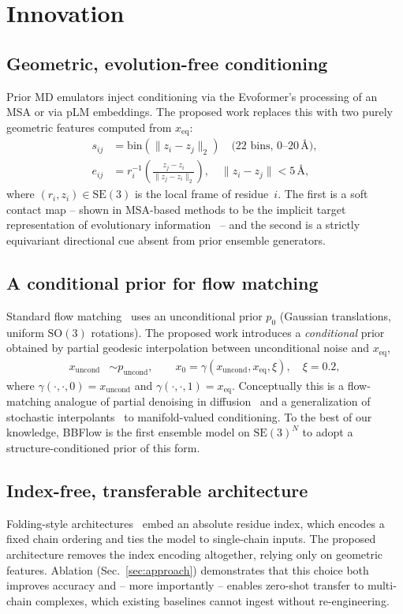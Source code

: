\documentclass[12pt]{article}
\begin{document}
\section{Innovation}

\subsection{Geometric, evolution-free conditioning}
Prior MD emulators inject conditioning via the Evoformer's processing of an MSA
or via pLM embeddings. The proposed work replaces this with two purely
geometric features computed from $x_{\mathrm{eq}}$:
\begin{align}
  s_{ij} &= \mathrm{bin}\!\left(\|z_i - z_j\|_2\right) \quad\text{(22 bins, $0$--$20\,\text{\AA}$)},\\
  e_{ij} &= r_i^{-1}\!\left(\frac{z_j-z_i}{\|z_j-z_i\|_2}\right), \quad \|z_i-z_j\| < 5\,\text{\AA},
\end{align}
where $(r_i, z_i) \in \mathrm{SE}(3)$ is the local frame of residue~$i$. The
first is a soft contact map -- shown in MSA-based methods to be the implicit
target representation of evolutionary information~\cite{lin2023esm2} -- and the
second is a strictly equivariant directional cue absent from prior ensemble
generators.

\subsection{A conditional prior for flow matching}
Standard flow matching~\cite{lipman2023flowmatching} uses an unconditional prior
$p_0$ (Gaussian translations, uniform $\mathrm{SO}(3)$ rotations). The proposed
work introduces a \emph{conditional} prior obtained by partial geodesic
interpolation between unconditional noise and $x_{\mathrm{eq}}$,
\begin{align}
  x_{\mathrm{uncond}} &\sim p_{\mathrm{uncond}}, \qquad
  x_0 = \gamma(x_{\mathrm{uncond}}, x_{\mathrm{eq}}, \xi), \quad \xi=0.2,
\end{align}
where $\gamma(\cdot, \cdot, 0) = x_{\mathrm{uncond}}$ and $\gamma(\cdot, \cdot, 1)
= x_{\mathrm{eq}}$. Conceptually this is a flow-matching analogue of partial
denoising in diffusion~\cite{lu2024str2str} and a generalization of stochastic
interpolants~\cite{albergo2022interpolants} to manifold-valued conditioning. To
the best of our knowledge, BBFlow is the first ensemble model on $\mathrm{SE}(3)^N$
to adopt a structure-conditioned prior of this form.

\subsection{Index-free, transferable architecture}
Folding-style architectures~\cite{jumper2021af2,jing2024alphaflow,yim2023fast}
embed an absolute residue index, which encodes a fixed chain ordering and ties
the model to single-chain inputs. The proposed architecture removes the index
encoding altogether, relying only on geometric features. Ablation
(Sec.~\ref{sec:approach}) demonstrates that this choice both improves accuracy
and -- more importantly -- enables zero-shot transfer to multi-chain complexes,
which existing baselines cannot ingest without re-engineering.
\end{document}
